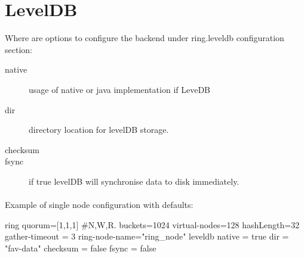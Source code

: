 \section{LevelDB}
Where are options to configure the backend under ring.leveldb configuration section:
\begin{description}
\item[native] usage of native or java implementation if LeveDB
\item[dir] directory location for levelDB storage.
\item[checksum]
\item[fsync] if true levelDB will synchronise data to disk immediately.
\end{description}

\paragraph{}
Example of single node configuration with defaults:

\begin{json}
ring{
  quorum=[1,1,1]  #N,W,R.
  buckets=1024
  virtual-nodes=128
  hashLength=32
  gather-timeout = 3
  ring-node-name="ring_node"
  leveldb {
    native = true
    dir = "fav-data"
    checksum = false
    fsync = false
  }
}
\end{json}
